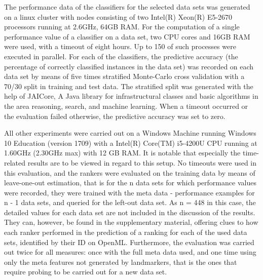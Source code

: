 
The performance data of the classifiers for the selected data sets was generated on a linux cluster with nodes consisting of two Intel(R) Xeon(R) E5-2670 processors running at 2.6GHz, 64GB RAM. For the computation of a single performance value of a classifier on a data set, two CPU cores and 16GB RAM were used, with a timeout of eight hours. Up to 150 of such processes were executed in parallel. For each of the classifiers, the predictive accuracy (the percentage of correctly classified instances in the data set) was recorded on each data set by means of five times stratified Monte-Carlo cross validation with a 70/30 split in training and test data. The stratified split was generated with the help of JAICore, \textquotesingle A Java library for infrastructural classes and basic algorithms in the area reasoning, search, and machine learning. When a timeout occurred or the evaluation failed otherwise, the predictive accuracy was set to zero.

All other experiments were carried out on a Windows Machine running Windows 10 Education (version 1709) with a Intel(R) Core(TM) i5-4200U CPU running at 1.60GHz (2.30GHz max) with 12 GB RAM. It is notable that especially the time-related results are to be viewed in regard to this setup. No timeouts were used in this evaluation, and the rankers were evaluated on the training data by means of leave-one-out estimation, that is for the n data sets for which performance values were recorded, they were trained with the meta data - performance examples for n - 1 data sets, and queried for the left-out data set. As n = 448 in this case, the detailed values for each data set are not included in the discussion of the results. They can, however, be found in the supplementary material, offering clues to how each ranker performed in the prediction of a ranking for each of the used data sets, identified by their ID on OpenML. Furthermore, the evaluation was carried out twice for all measures: once with the full meta data used, and one time using only the meta features not generated by landmarkers, that is the ones that require probing to be carried out for a new data set.

